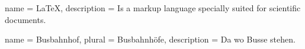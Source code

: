 %
\makeglossaries{}

{
    name = LaTeX,
    description = {
        Is a markup language specially suited for scientific documents.%
    }
}

{
    name = Busbahnhof,
    plural = Busbahnhöfe,
    description = {Da wo Busse stehen.}
}

\glsclearpage
